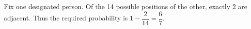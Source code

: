 Fix one designated person. Of the 14 possible positions of the other, exactly 2 are adjacent. Thus the required probability is $1-\dfrac{2}{14}=\boxed{\dfrac{6}{7}}$.
